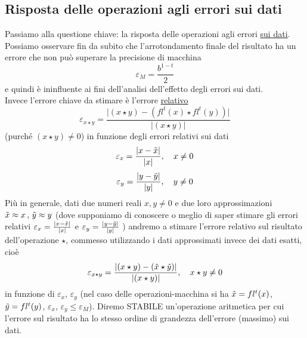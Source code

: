 \documentclass[12pt]{article}
\begin{document}
\subsection{Risposta delle operazioni agli errori sui dati}
Passiamo alla questione chiave: la risposta delle operazioni agli errori \uline{sui dati}.\\
Possiamo osservare fin da subito che l’arrotondamento finale del risultato ha un errore che non può superare la precisione di macchina \[ \varepsilon_M = \frac{b^{1-t}}{2}\]
e quindi è ininfluente ai fini dell'analisi dell'effetto degli errori sui dati. \\
Invece l’errore chiave da stimare è l’errore \uline{relativo} 
\[ \varepsilon_{x \star y} = \frac{\lvert (x \star y) - (fl^t (x) \star fl^t (y)) \rvert}{\lvert (x \star y) \rvert} \]
(purché $(x \star y) \ne 0$) in funzione degli errori relativi sui dati
\[ \varepsilon_x = \frac{\lvert x - \Tilde{x} \rvert}{\lvert x \rvert}, \quad x \ne 0 \]
\[ \varepsilon_y = \frac{\lvert y - \Tilde{y} \rvert}{\lvert y \rvert}, \quad y \ne 0 \]
Più in generale, dati due numeri reali $x, y \ne 0$ e due loro approssimazioni $\Tilde{x} \approx x\,,\, \Tilde{y} \approx y$ (dove supponiamo di conoscere o meglio di saper stimare gli errori relativi $ \varepsilon_x = \frac{\lvert x - \Tilde{x} \rvert}{\lvert x \rvert}$ e $ \varepsilon_y = \frac{\lvert y - \Tilde{y} \rvert}{\lvert y \rvert}$ ) andremo a stimare l’errore relativo sul risultato dell'operazione $\star$, commesso utilizzando i dati approssimati invece dei dati esatti, cioè
\[ \varepsilon_{x \star y} = \frac{\lvert (x \star y) - (\Tilde{x} \star \Tilde{y}) \rvert}{\lvert (x \star y) \rvert}, \quad x \star y \ne 0 \]
in funzione di $\varepsilon_x$, $\varepsilon_y$ (nel caso delle operazioni-macchina si ha $\Tilde{x} = fl^t(x)$, $\Tilde{y} = fl^t(y)$, $\varepsilon_x$, $\varepsilon_y \le \varepsilon_M$).
Diremo STABILE un’operazione aritmetica per cui l’errore sul risultato ha lo stesso ordine di grandezza dell'errore (massimo) sui dati.
\end{document}
